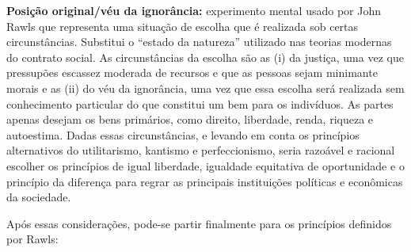 \documentclass[
	12pt,				%
	openright,			%
	twoside,			%
	a4paper,			%
	chapter=TITLE,		%
	section=TITLE,		%
	subsection=TITLE,	%
	subsubsection=TITLE,%
	spanish,            %
	english,			%
	brazil				%
	]{abntex2}
\begin{document}
\begin{citacao}
	\textbf{Posição original/véu da ignorância:} experimento mental usado por John Rawls que representa uma situação de escolha que é realizada sob certas circunstâncias. Substitui o “estado da natureza” utilizado nas teorias modernas do contrato social. As circunstâncias da escolha são as (i) da justiça, uma vez que pressupões escassez moderada de recursos e que as pessoas sejam minimante morais e as (ii) do véu da ignorância, uma vez que essa escolha será realizada sem conhecimento particular do que constitui um bem para os indivíduos. As partes apenas desejam os bens primários, como direito, liberdade, renda, riqueza e autoestima. Dadas essas circunstâncias, e levando em conta os princípios alternativos do utilitarismo, kantismo e perfeccionismo, seria razoável e racional escolher os princípios de igual liberdade, igualdade equitativa de oportunidade e o princípio da diferença para regrar as principais instituições políticas e econômicas da sociedade.\cite[p. ~303]{Coitinho}
\end{citacao}
\par
Após essas considerações, pode-se partir finalmente para os princípios definidos por Rawls:
\end{document}
